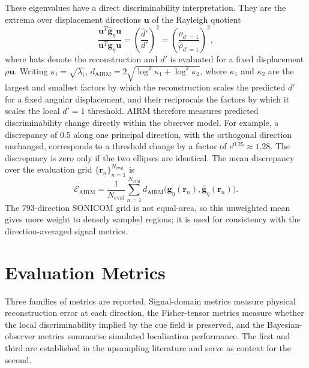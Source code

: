 \documentclass[journal]{IEEEtran}
\begin{document}
These eigenvalues have a direct discriminability interpretation. They are the extrema over displacement directions \(\mathbf u\) of the Rayleigh quotient
\begin{equation}
\frac{\mathbf u^T\widehat{\mathbf g}_{\eta}\mathbf u}{\mathbf u^T\mathbf g_{\eta}\mathbf u}
=
\left(\frac{\widehat{d}'}{d'}\right)^{2}
=
\left(\frac{\rho_{d'=1}}{\widehat{\rho}_{d'=1}}\right)^{2},
\end{equation}
where hats denote the reconstruction and \(d'\) is evaluated for a fixed displacement \(\rho\mathbf u\). Writing \(\kappa_i=\sqrt{\lambda_i}\), \(d_{\mathrm{AIRM}}=2\sqrt{\log^2\kappa_1+\log^2\kappa_2}\), where \(\kappa_1\) and \(\kappa_2\) are the largest and smallest factors by which the reconstruction scales the predicted \(d'\) for a fixed angular displacement, and their reciprocals the factors by which it scales the local \(d'=1\) threshold. AIRM therefore measures predicted discriminability change directly within the observer model. For example, a discrepancy of \(0.5\) along one principal direction, with the orthogonal direction unchanged, corresponds to a threshold change by a factor of \(e^{0.25}\approx1.28\). The discrepancy is zero only if the two ellipses are identical. The mean discrepancy over the evaluation grid \(\{\mathbf r_n\}_{n=1}^{N_{\mathrm{eval}}}\) is
\begin{equation}
\mathcal{E}_{\mathrm{AIRM}} =
\frac{1}{N_{\mathrm{eval}}}\sum_{n=1}^{N_{\mathrm{eval}}}
 d_{\mathrm{AIRM}}\bigl(\mathbf g_\eta(\mathbf r_n),
 \widehat{\mathbf g}_\eta(\mathbf r_n)\bigr).
\label{eq:mean_airm}
\end{equation}
The 793-direction SONICOM grid is not equal-area, so this unweighted mean gives more weight to densely sampled regions; it is used for consistency with the direction-averaged signal metrics.

\section{Evaluation Metrics}
Three families of metrics are reported. Signal-domain metrics measure physical reconstruction error at each direction, the Fisher-tensor metrics measure whether the local discriminability implied by the cue field is preserved, and the Bayesian-observer metrics summarise simulated localisation performance. The first and third are established in the upsampling literature and serve as context for the second.
\end{document}
